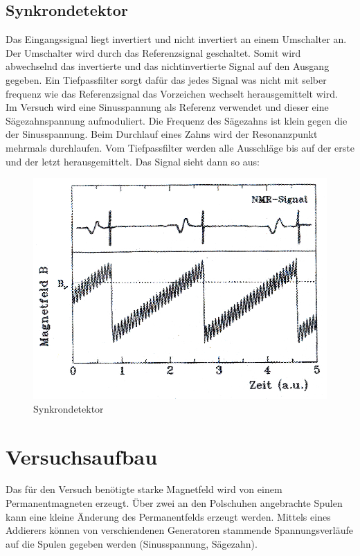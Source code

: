 \documentclass[12pt]{article}
\begin{document}
\subsection{Synkrondetektor}
Das Eingangssignal liegt invertiert und nicht invertiert an einem Umschalter an. Der Umschalter wird durch das Referenzsignal geschaltet. Somit wird abwechselnd das invertierte und das nichtinvertierte Signal auf den Ausgang gegeben. Ein Tiefpassfilter sorgt dafür das jedes Signal was nicht mit selber frequenz wie das Referenzsignal das Vorzeichen wechselt herausgemittelt wird.\\

Im Versuch wird eine Sinusspannung als Referenz verwendet und dieser eine Sägezahnspannung aufmoduliert. Die Frequenz des Sägezahns ist klein gegen die der Sinusspannung. Beim Durchlauf eines Zahns wird der Resonanzpunkt mehrmals durchlaufen. Vom Tiefpassfilter werden alle Ausschläge bis auf der erste und der letzt herausgemittelt. Das Signal sieht dann so aus:
\begin{figure}[H]
\centering
\includegraphics[width=0.9\linewidth]{pictures/schemalockin.eps}
\caption{Synkrondetektor}
\end{figure}

\section{Versuchsaufbau}
Das für den Versuch benötigte starke Magnetfeld wird von einem Permanentmagneten erzeugt. Über zwei an den Polschuhen angebrachte Spulen kann eine kleine Änderung des Permanentfelds erzeugt werden. Mittels eines Addierers können von verschiendenen Generatoren stammende Spannungsverläufe auf die Spulen gegeben werden (Sinusspannung, Sägezahn).\\
\end{document}
